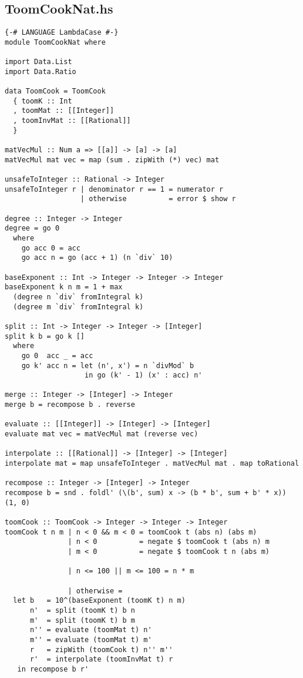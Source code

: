 \documentclass[a4paper]{article}
\begin{document}
\subsection{ToomCookNat.hs}
\begin{verbatim}
{-# LANGUAGE LambdaCase #-}
module ToomCookNat where

import Data.List
import Data.Ratio

data ToomCook = ToomCook
  { toomK :: Int
  , toomMat :: [[Integer]]
  , toomInvMat :: [[Rational]]
  }

matVecMul :: Num a => [[a]] -> [a] -> [a]
matVecMul mat vec = map (sum . zipWith (*) vec) mat

unsafeToInteger :: Rational -> Integer
unsafeToInteger r | denominator r == 1 = numerator r
                  | otherwise          = error $ show r

degree :: Integer -> Integer
degree = go 0
  where
    go acc 0 = acc
    go acc n = go (acc + 1) (n `div` 10)

baseExponent :: Int -> Integer -> Integer -> Integer
baseExponent k n m = 1 + max
  (degree n `div` fromIntegral k)
  (degree m `div` fromIntegral k)

split :: Int -> Integer -> Integer -> [Integer]
split k b = go k []
  where
    go 0  acc _ = acc
    go k' acc n = let (n', x') = n `divMod` b
                   in go (k' - 1) (x' : acc) n'

merge :: Integer -> [Integer] -> Integer
merge b = recompose b . reverse

evaluate :: [[Integer]] -> [Integer] -> [Integer]
evaluate mat vec = matVecMul mat (reverse vec)

interpolate :: [[Rational]] -> [Integer] -> [Integer]
interpolate mat = map unsafeToInteger . matVecMul mat . map toRational

recompose :: Integer -> [Integer] -> Integer
recompose b = snd . foldl' (\(b', sum) x -> (b * b', sum + b' * x)) (1, 0)

toomCook :: ToomCook -> Integer -> Integer -> Integer
toomCook t n m | n < 0 && m < 0 = toomCook t (abs n) (abs m)
               | n < 0          = negate $ toomCook t (abs n) m
               | m < 0          = negate $ toomCook t n (abs m)

               | n <= 100 || m <= 100 = n * m

               | otherwise =
  let b   = 10^(baseExponent (toomK t) n m)
      n'  = split (toomK t) b n
      m'  = split (toomK t) b m
      n'' = evaluate (toomMat t) n'
      m'' = evaluate (toomMat t) m'
      r   = zipWith (toomCook t) n'' m''
      r'  = interpolate (toomInvMat t) r
   in recompose b r'
\end{verbatim}
\end{document}
